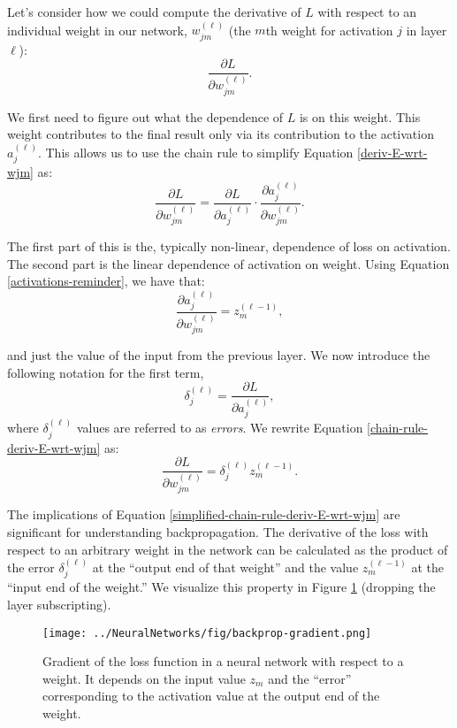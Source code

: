 Let's consider how we could compute the derivative of $L$ with respect to an individual weight in our network, $w^{(\ell)}_{jm}$ (the $m$th weight for activation $j$ in layer $\ell$):
%
\begin{equation} \label{deriv-E-wrt-wjm}
	\frac{\partial L}{\partial w^{(\ell)}_{jm}}.
\end{equation}

We first need to figure out what the dependence of $L$ is on this weight. This weight contributes to the final result only via its contribution to the activation $a^{(\ell)}_{j}$. This allows us to use the chain rule to simplify Equation \ref{deriv-E-wrt-wjm} as:
%
\begin{equation} \label{chain-rule-deriv-E-wrt-wjm}
	\frac{\partial L}{\partial w^{(\ell)}_{jm}} = \frac{\partial L}{\partial a^{(\ell)}_{j}} \cdot \frac{\partial a^{(\ell)}_{j}}{\partial w^{(\ell)}_{jm}}.
      \end{equation}

      The first part of this is the, typically non-linear, dependence of loss on activation. The second part is the linear dependence of activation on weight.
Using Equation \ref{activations-reminder}, we have that:
\begin{equation*}
	\frac{\partial a^{(\ell)}_{j}}{\partial w^{(\ell)}_{jm}} = z^{(\ell-1)}_{m},
\end{equation*}

and just the value of the input from the previous layer. We now introduce the following notation for the first term,
%
\begin{equation} \label{delta-expression}
	\delta^{(\ell)}_{j} = \frac{\partial L}{\partial a^{(\ell)}_{j}},
\end{equation}
where $\delta^{(\ell)}_{j}$ values are referred to as \textit{errors}. We rewrite Equation \ref{chain-rule-deriv-E-wrt-wjm} as:
%
\begin{equation} \label{simplified-chain-rule-deriv-E-wrt-wjm}
	\frac{\partial L}{\partial w^{(\ell)}_{jm}} = \delta^{(\ell)}_{j} z^{(\ell-1)}_{m}.
\end{equation}

The implications of Equation \ref{simplified-chain-rule-deriv-E-wrt-wjm} are significant for understanding backpropagation.  The derivative of the loss with respect to an arbitrary weight in the network
can be calculated as the product of the error $\delta^{(\ell)}_j$ at the ``output end of that weight'' and the value $z^{(\ell-1)}_m$ at the ``input end of the weight.''  We visualize this property in Figure \ref{fig:backprop-gradient} (dropping the layer subscripting).
%
\begin{figure}
    \centering
    \texttt{[image: ../NeuralNetworks/fig/backprop-gradient.png]}
    \caption{Gradient of the loss function in a neural network with respect to a weight. It depends on the input value $z_m$ and the ``error'' corresponding to the activation value at the output end of the weight.}
    \label{fig:backprop-gradient}
\end{figure}

